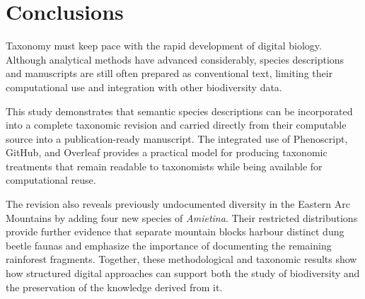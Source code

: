 \section*{Conclusions}

Taxonomy must keep pace with the rapid development of digital biology. Although analytical methods have advanced considerably, species descriptions and manuscripts are still often prepared as conventional text, limiting their computational use and integration with other biodiversity data.

This study demonstrates that semantic species descriptions can be incorporated into a complete taxonomic revision and carried directly from their computable source into a publication-ready manuscript. The integrated use of Phenoscript, GitHub, and Overleaf provides a practical model for producing taxonomic treatments that remain readable to taxonomists while being available for computational reuse.

The revision also reveals previously undocumented diversity in the Eastern Arc Mountains by adding four new species of \textit{Amietina}. Their restricted distributions provide further evidence that separate mountain blocks harbour distinct dung beetle faunas and emphasize the importance of documenting the remaining rainforest fragments. Together, these methodological and taxonomic results show how structured digital approaches can support both the study of biodiversity and the preservation of the knowledge derived from it.
